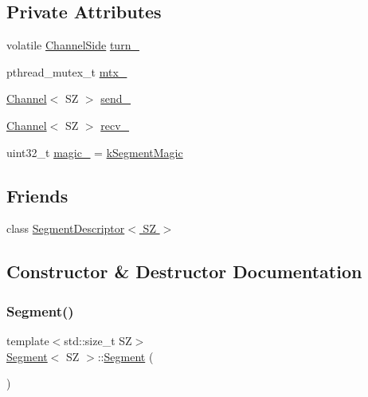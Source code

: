 \subsection*{Private Attributes}
\begin{DoxyCompactItemize}
\item 
volatile \hyperlink{proxy_8hpp_a249fda9ad200a554304ecf8de90d6877}{Channel\+Side} \hyperlink{classSegment_aa621c3ec3839a512ed61dd46406898de}{turn\+\_\+}
\item 
pthread\+\_\+mutex\+\_\+t \hyperlink{classSegment_af3cecd4372c6d3dc9aa482fa2da400e3}{mtx\+\_\+}
\item 
\hyperlink{classChannel}{Channel}$<$ SZ $>$ \hyperlink{classSegment_a237c718cfb7a495768efce6ca0c85c4c}{send\+\_\+}
\item 
\hyperlink{classChannel}{Channel}$<$ SZ $>$ \hyperlink{classSegment_a9fee642411f628501a3b0a972120c282}{recv\+\_\+}
\item 
uint32\+\_\+t \hyperlink{classSegment_abbfd0d6f6001b589b8dbc1e9ab837471}{magic\+\_\+} = \hyperlink{proxy_8hpp_af735db148c9e9f49d4feb7a4f5271b7a}{k\+Segment\+Magic}
\end{DoxyCompactItemize}
\subsection*{Friends}
\begin{DoxyCompactItemize}
\item 
class \hyperlink{classSegment_aa9880fe41382d4118e3f013f9058746d}{Segment\+Descriptor$<$ S\+Z $>$}
\end{DoxyCompactItemize}


\subsection{Constructor \& Destructor Documentation}
\mbox{\label{classSegment_a9712a89eb6463d5ee551c2f60e30bd96}} 
\subsubsection{\texorpdfstring{Segment()}{Segment()}}
{\footnotesize\ttfamily template$<$std\+::size\+\_\+t SZ$>$ \\
\hyperlink{classSegment}{Segment}$<$ SZ $>$\+::\hyperlink{classSegment}{Segment} (\begin{DoxyParamCaption}{ }\end{DoxyParamCaption})\hspace{0.3cm}{\ttfamily [inline]}}



